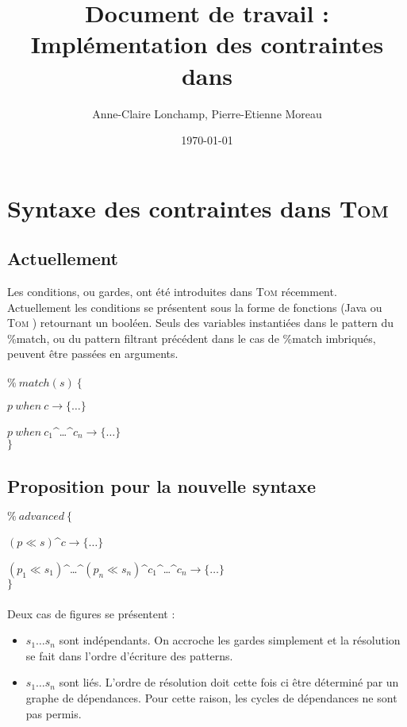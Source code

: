 \documentclass{article}
\title{Document de travail :\\ Impl\'ementation des contraintes dans \tom}
\author{Anne-Claire Lonchamp, Pierre-Etienne Moreau}
\date\today
\newcommand{\tom}{\textsc{Tom} }
\newcommand{\filter}{\ll}
\begin{document}
\maketitle

\section{Syntaxe des contraintes dans \tom}

\subsection{Actuellement}

Les conditions, ou gardes, ont \'et\'e introduites dans \tom r\'ecemment.
\\

Actuellement les conditions se pr\'esentent sous la forme de fonctions (Java ou \tom) retournant un bool\'een.
Seuls des variables instanti\'ees dans le pattern du \%match, ou du pattern filtrant pr\'ec\'edent dans le cas de \%match imbriqu\'es, peuvent \^etre pass\'ees en arguments.
\\\\
$\%\:match(s)\:\{$

$p\:when\:c\rightarrow\{\dots\}$

$p\:when\:c_1$\textasciicircum\dots\textasciicircum$ c_n\rightarrow\{\dots\}$
\\$\}$

\subsection{Proposition pour la nouvelle syntaxe}
$\%\:advanced\:\{$

$(p\filter s)$\textasciicircum$c\rightarrow\{\dots\}$

$(p_1\filter s_1)$\textasciicircum\dots\textasciicircum$(p_n\filter s_n)$\textasciicircum$c_1$\textasciicircum\dots\textasciicircum$c_n\rightarrow\{\dots\}$
\\$\}$
\\\\Deux cas de figures se pr\'esentent :
\begin{itemize}
\item $s_1\dots s_n$ sont ind\'ependants. On accroche les gardes simplement et la r\'esolution se fait dans l'ordre d'\'ecriture des patterns.
\item $s_1\dots s_n$ sont li\'es. L'ordre de r\'esolution doit cette fois ci \^etre d\'etermin\'e par un graphe de d\'ependances. Pour cette raison, les cycles de d\'ependances ne sont pas permis. 
\end{itemize}
\end{document}
